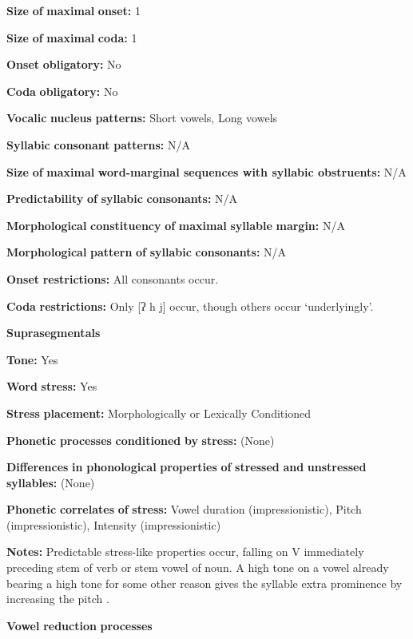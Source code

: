 \begin{styleBody}
\textbf{Size} \textbf{of} \textbf{maximal} \textbf{onset:} 1

\textbf{Size} \textbf{of} \textbf{maximal} \textbf{coda:} 1

\textbf{Onset} \textbf{obligatory:} No

\textbf{Coda} \textbf{obligatory:} No

\textbf{Vocalic} \textbf{nucleus} \textbf{patterns:} Short vowels, Long vowels

\textbf{Syllabic} \textbf{consonant} \textbf{patterns:} N/A

\textbf{Size} \textbf{of} \textbf{maximal} \textbf{word{}-marginal sequences with syllabic obstruents:} N/A

\textbf{Predictability} \textbf{of} \textbf{syllabic} \textbf{consonants:} N/A

\textbf{Morphological} \textbf{constituency} \textbf{of} \textbf{maximal} \textbf{syllable} \textbf{margin:} N/A

\textbf{Morphological} \textbf{pattern} \textbf{of} \textbf{syllabic} \textbf{consonants:} N/A

\textbf{Onset} \textbf{restrictions:} All consonants occur.

\textbf{Coda} \textbf{restrictions:} Only [ʔ h j] occur, though others occur ‘underlyingly’.

\textbf{Suprasegmentals}

\textbf{Tone:} Yes

\textbf{Word} \textbf{stress:} Yes

\textbf{Stress} \textbf{placement:} Morphologically or Lexically Conditioned

\textbf{Phonetic} \textbf{processes} \textbf{conditioned} \textbf{by} \textbf{stress:} (None)

\textbf{Differences} \textbf{in} \textbf{phonological} \textbf{properties} \textbf{of} \textbf{stressed} \textbf{and} \textbf{unstressed} \textbf{syllables:} (None)

\textbf{Phonetic} \textbf{correlates} \textbf{of} \textbf{stress:} Vowel duration (impressionistic), Pitch (impressionistic), Intensity (impressionistic)

\textbf{Notes:} Predictable stress-like properties occur, falling on V immediately preceding stem of verb or stem vowel of noun. A high tone on a vowel already bearing a high tone for some other reason gives the syllable extra prominence by increasing the pitch \citep[362]{Rice2005}.

\textbf{Vowel} \textbf{reduction} \textbf{processes}


\end{styleBody}
